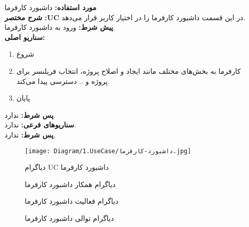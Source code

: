 \textbf{مورد استفاده:}
داشبورد کارفرما
\\
\textbf{شرح مختصر :UC}
در این قسمت داشبورد کارفرما را در اختیار کاربر قرار می‌دهد.
\\
\textbf{پيش شرط:}
ورود به داشبورد کارفرما.
\\
\textbf{سناريو اصلی:}
\begin{enumerate}
	\item
	شروع
	\item
	کارفرما به بخش‌های مختلف مانند ایجاد و اصلاح پروژه، انتخاب فریلنسر برای پروژه و .. دسترسی پیدا می‌کند.
	\item
	پایان
\end{enumerate}

\noindent
\textbf{پس شرط:}
ندارد.
\\
\textbf{سناريوهای فرعی:}
ندارد.
\\
\textbf{پس شرط:}
ندارد.


\begin{figure}[H]
	\centering
	\texttt{[image: Diagram/1.UseCase/داشبورد-کارفرما.jpg]}
	\caption{دیاگرام UC ‌داشبورد کارفرما}
	\label{fig:uc:داشبورد-کارفرما}
\end{figure}
\begin{figure}[H]
	\centering
	\caption{دیاگرام همکار داشبورد کارفرما}
	\label{fig:c:داشبورد-کارفرما}
\end{figure}
\begin{figure}[H]
	\centering
	\caption{دیاگرام فعالیت داشبورد کارفرما‌}
	\label{fig:a:داشبورد-کارفرما}
\end{figure}
\begin{figure}[H]
	\centering
	\caption{دیاگرام توالی ‌داشبورد کارفرما}
	\label{fig:s:داشبورد-کارفرما}
\end{figure}
